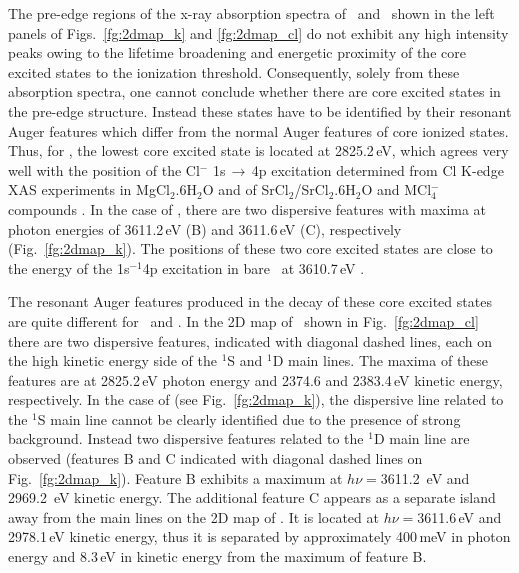 The pre-edge regions of the x-ray absorption spectra of \ki~and \cli~shown in the left panels of Figs.\ \ref{fg:2dmap_k} and \ref{fg:2dmap_cl} do not exhibit any high intensity peaks owing to the lifetime broadening and energetic proximity of the core excited states to the ionization threshold. Consequently, solely from these absorption spectra, one cannot conclude whether there are core excited states in the pre-edge structure. Instead these states have to be identified by their resonant Auger features which differ from the normal Auger features of core ionized states. Thus, for \cli, the lowest core excited state is located at 2825.2\,eV, which agrees very well with the position of the Cl$^{-}$ 1s$\,\rightarrow\,$4p excitation determined from Cl K-edge XAS experiments in MgCl$_2$.6H$_2$O and of SrCl$_2$/SrCl$_2$.6H$_2$O \citep{sugiura82:681} and MCl$_{4}^{-}$ compounds \citep{shadle95:2259}. In the case of \ki, there are two dispersive features with maxima at photon energies of 3611.2\,eV (B) and 3611.6\,eV (C), respectively (Fig.\ \ref{fg:2dmap_k}). The positions of these two core excited states are close to the energy of the 1s$^{-1}$4p excitation in bare \ki~at 3610.7\,eV \citep{hertlein06:062715}.


The resonant Auger features produced in the decay of these core excited states are quite different for \cli~and \ki. In the 2D map of \cli~shown in Fig.\ \ref{fg:2dmap_cl} there are two dispersive features, indicated with diagonal dashed lines, each on the high kinetic energy side of the $^1$S and $^1$D main lines. The maxima of these features are at 2825.2\,eV photon energy and 2374.6 and 2383.4\,eV kinetic energy, respectively. In the case of \ki (see Fig.\ \ref{fg:2dmap_k}), the dispersive line related to the $^1$S main line cannot be clearly identified due to the presence of strong background. Instead two dispersive features related to the $^1$D main line are observed (features B and C indicated with diagonal dashed lines on Fig.\ \ref{fg:2dmap_k}). Feature B exhibits a maximum at $h\nu = $3611.2 \,eV and 2969.2 \,eV kinetic energy. The additional feature C appears as a separate island away from the main lines on the 2D map of \ki. It is located at $h\nu = $3611.6\,eV and 2978.1\,eV kinetic energy, thus it is separated by approximately 400\,meV in photon energy and 8.3\,eV in kinetic energy from the maximum of feature B. 


